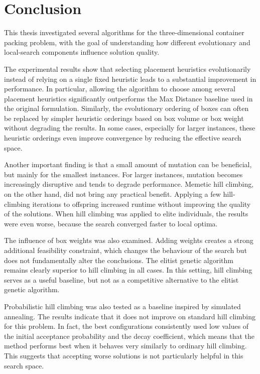 \chapter*{Conclusion}

This thesis investigated several algorithms for the three-dimensional container packing problem, 
with the goal of understanding how different evolutionary and local-search components influence solution quality.

The experimental results show that selecting placement heuristics evolutionarily instead of relying
on a single fixed heuristic leads to a substantial improvement in performance. 
In particular, allowing the algorithm to choose among several placement heuristics 
significantly outperforms the Max Distance baseline used in the original formulation. 
Similarly, the evolutionary ordering of boxes can often be replaced by simpler heuristic 
orderings based on box volume or box weight without degrading the results. 
In some cases, especially for larger instances, these heuristic orderings even improve convergence by reducing the effective search space.

Another important finding is that a small amount of mutation can be beneficial, 
but mainly for the smallest instances. For larger instances, mutation becomes increasingly 
disruptive and tends to degrade performance. Memetic hill climbing, on the other hand, 
did not bring any practical benefit. Applying a few hill-climbing iterations to offspring 
increased runtime without improving the quality of the solutions. 
When hill climbing was applied to elite individuals, 
the results were even worse, because the search converged faster to local optima.

The influence of box weights was also examined. Adding weights creates a strong additional 
feasibility constraint, which changes the behaviour of the search but does not fundamentally alter the conclusions. 
The elitist genetic algorithm remains clearly superior to hill climbing in all cases. 
In this setting, hill climbing serves as a useful baseline, 
but not as a competitive alternative to the elitist genetic algorithm.

Probabilistic hill climbing was also tested as a baseline inspired 
by simulated annealing. The results indicate that it does not improve 
on standard hill climbing for this problem. In fact, the best configurations 
consistently used low values of the initial acceptance probability 
and the decay coefficient, which means that the method performs best 
when it behaves very similarly to ordinary hill climbing. 
This suggests that accepting worse solutions is not particularly helpful in this search space.

